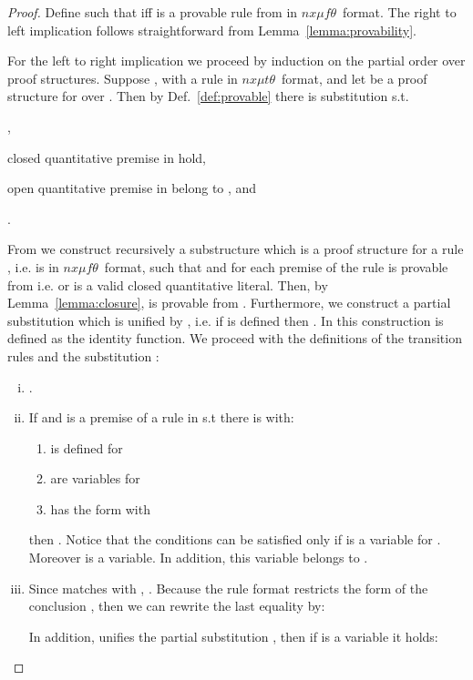 \documentclass[submission,copyright,creativecommons]{eptcs}
\newcommand{\nxmuft}{\ensuremath{\textit{nx}\mu\textit{f}\theta}}
\newcommand{\nxmutt}{\ensuremath{\textit{nx}\mu\textit{t}\theta}}
\begin{document}
\begin{proof}
 Define  such that  iff 
  is a provable rule from  in \nxmuft\ format.
The right to left implication follows straightforward from Lemma~\ref{lemma:provability}.

 For the left to right implication we proceed by induction on the partial order over proof structures.
 Suppose , with a rule  in \nxmutt\ format, 
 and let  be a proof structure for   over .
Then by Def.~\ref{def:provable} there is substitution  s.t.
 \begin{inparaenum}[(a)]
 \item ,
 \item closed quantitative premise in  hold,
 \item open quantitative premise in  belong to ,
 and
 \item .  
 \end{inparaenum}

 From  we construct recursively a substructure  
 which is a proof structure for a rule , i.e.  is in \nxmuft\  format, 
 such that   and 
 for each premise  of  the rule  is provable from 
i.e.   or  is a valid closed quantitative literal.
 Then, by Lemma~\ref{lemma:closure},  is provable from .
Furthermore, we construct a partial substitution  which is unified by , 
  i.e. if  is defined then .
  In this construction  is defined as the identity function.
We proceed with the definitions of the transition rules  and the substitution : 
\begin{enumerate}[(i)]
  \item . 
  \item \label{cond:B&rho:ii}
  If  and  is a premise 
  of a rule in  s.t there is  with:
 \begin{enumerate}
  \item  is defined for  
  \item  are variables for  \item  has the form  with 
 \end{enumerate}
 then . 
 Notice that the conditions can be satisfied only if  
  is a variable for . 
 Moreover  is a variable. 
 In addition, this variable belongs to  .

\item \label{cond:B&rho:iii}Since  matches with , . 
 Because the rule format restricts the form of the conclusion , 
 then we can rewrite the last equality by:
  
In addition,  unifies the partial substitution ,
 then if  is a variable it holds:
 


\end{enumerate}
\end{proof}
\end{document}
